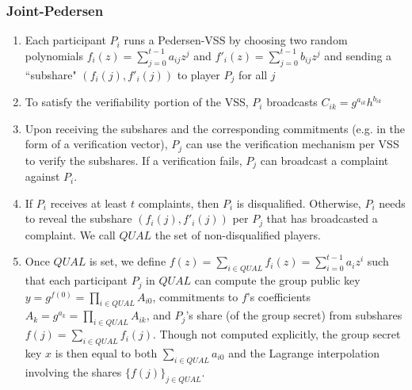 \documentclass[11pt]{article}
\theoremstyle{definition}
\theoremstyle{remark}
\begin{document}
\subsubsection{Joint-Pedersen}
\begin{enumerate}
\item Each participant $P_i$ runs a Pedersen-VSS by choosing two random polynomials $f_i(z) = \sum_{j = 0}^{t - 1} a_{ij} z^j$ and $f'_i(z) = \sum_{j = 0}^{t - 1} b_{ij} z^j$ and sending a ``subshare" $(f_i(j), f'_i(j))$ to player $P_j$ for all $j$
\item To satisfy the verifiability portion of the VSS, $P_i$ broadcasts $C_{ik} = g^{a_{ik}} h^{b_{ik}}$
\item Upon receiving the subshares and the corresponding commitments (e.g. in the form of a verification vector), $P_j$ can use the verification mechanism per VSS to verify the subshares. If a verification fails, $P_j$ can broadcast a complaint against $P_i$.
\item If $P_i$ receives at least $t$ complaints, then $P_i$ is disqualified. Otherwise, $P_i$ needs to reveal the subshare $(f_i(j), f'_i(j))$ per $P_j$ that has broadcasted a complaint. We call $QUAL$ the set of non-disqualified players.
\item Once $QUAL$ is set, we define $f(z) = \sum_{i \in QUAL} f_i(z) = \sum_{i = 0}^{t - 1} a_i z^i$ such that each participant $P_j$ in $QUAL$ can compute the group public key $y = g^{f(0)} = \prod_{i \in QUAL} A_{i0}$, commitments to $f$'s coefficients $A_k = g^{a_k} = \prod_{i \in QUAL} A_{ik}$, and $P_j$'s share (of the group secret) from subshares $f(j) = \sum_{i \in QUAL} f_i(j)$. Though not computed explicitly, the group secret key $x$ is then equal to both $\sum_{i \in QUAL} a_{i0}$ and the Lagrange interpolation involving the shares $\{f(j)\}_{j \in QUAL}$.
\end{enumerate}


\end{document}
